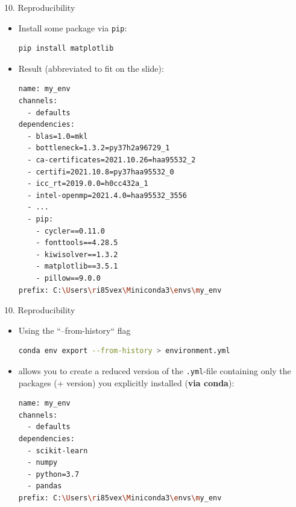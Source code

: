 \begin{vbframe}{10. Reproducibility}

\vfill

\begin{itemize}
	\item Install some package via \texttt{pip}:
		\begin{lstlisting}[language=bash]
pip install matplotlib
		\end{lstlisting}
	\item Result (abbreviated to fit on the slide):
		\begin{lstlisting}[language=bash,basicstyle=\tiny\ttfamily]
name: my_env
channels:
  - defaults
dependencies:
  - blas=1.0=mkl
  - bottleneck=1.3.2=py37h2a96729_1
  - ca-certificates=2021.10.26=haa95532_2
  - certifi=2021.10.8=py37haa95532_0
  - icc_rt=2019.0.0=h0cc432a_1
  - intel-openmp=2021.4.0=haa95532_3556
  - ...
  - pip:
    - cycler==0.11.0
    - fonttools==4.28.5
    - kiwisolver==1.3.2
    - matplotlib==3.5.1
    - pillow==9.0.0
prefix: C:\Users\ri85vex\Miniconda3\envs\my_env
		\end{lstlisting}
\end{itemize}

\vfill

\end{vbframe}


\begin{vbframe}{10. Reproducibility}

\vfill

\begin{itemize}
	\item Using the ``--from-history`` flag
		\begin{lstlisting}[language=bash]
conda env export --from-history > environment.yml
		\end{lstlisting}
	\item allows you to create a reduced version of the \texttt{.yml}-file containing only the packages (+ version) you explicitly installed (\textbf{via conda}):  
		\begin{lstlisting}[language=bash]
name: my_env
channels:
  - defaults
dependencies:
  - scikit-learn
  - numpy
  - python=3.7
  - pandas
prefix: C:\Users\ri85vex\Miniconda3\envs\my_env
		\end{lstlisting}
\end{itemize}

\vfill

\end{vbframe}

